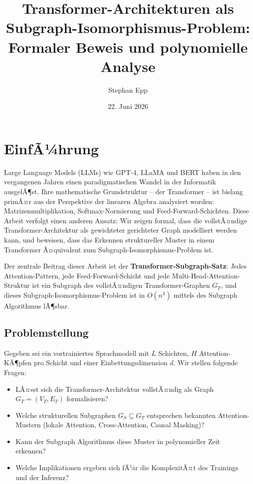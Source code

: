 ﻿\documentclass[a4paper,12pt]{article}
\title{Transformer-Architekturen als\\Subgraph-Isomorphismus-Problem:\\
Formaler Beweis und polynomielle Analyse}
\author{Stephan Epp}
\date{22. Juni 2026}
\theoremstyle{definition}
\begin{document}
\maketitle

\tableofcontents
\newpage

\section{EinfÃ¼hrung}

Large Language Models (LLMs) wie GPT-4, LLaMA und BERT haben in den
vergangenen Jahren einen paradigmatischen Wandel in der Informatik ausgelÃ¶st.
Ihre mathematische Grundstruktur -- der Transformer -- ist bislang primÃ¤r
aus der Perspektive der linearen Algebra analysiert worden: Matrizenmultiplikation,
Softmax-Normierung und Feed-Forward-Schichten. Diese Arbeit verfolgt
einen anderen Ansatz: Wir zeigen formal, dass die vollstÃ¤ndige
Transformer-Architektur als gewichteter gerichteter Graph modelliert werden kann,
und beweisen, dass das Erkennen struktureller Muster in einem Transformer
Ã¤quivalent zum Subgraph-Isomorphismus-Problem ist.

Der zentrale Beitrag dieser Arbeit ist der \textbf{Transformer-Subgraph-Satz}:
Jedes Attention-Pattern, jede Feed-Forward-Schicht und jede Multi-Head-Attention-Struktur
ist ein Subgraph des vollstÃ¤ndigen Transformer-Graphen $G_T$, und dieses Subgraph-Isomorphismus-Problem
ist in $O(n^3)$ mittels des Subgraph Algorithmus \cite{epp2026subgraph} lÃ¶sbar.

\subsection{Problemstellung}

Gegeben sei ein vortrainiertes Sprachmodell mit $L$ Schichten, $H$ Attention-KÃ¶pfen
pro Schicht und einer Einbettungsdimension $d$. Wir stellen folgende Fragen:

\begin{itemize}
	\item LÃ¤sst sich die Transformer-Architektur vollstÃ¤ndig als Graph $G_T = (V_T, E_T)$ formalisieren?
	\item Welche strukturellen Subgraphen $G_S \subseteq G_T$ entsprechen
	      bekannten Attention-Mustern (lokale Attention, Cross-Attention, Causal Masking)?
	\item Kann der Subgraph Algorithmus diese Muster in polynomieller Zeit erkennen?
	\item Welche Implikationen ergeben sich fÃ¼r die KomplexitÃ¤t des Trainings und der Inferenz?
\end{itemize}
\end{document}
